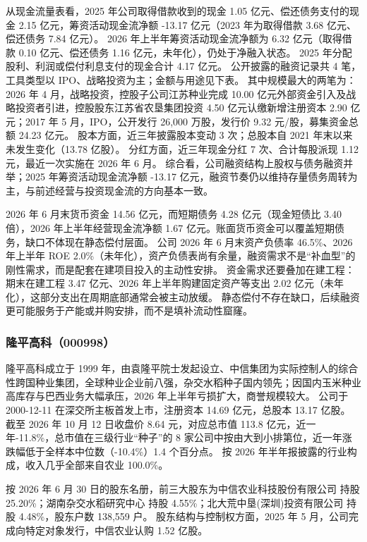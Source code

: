  从现金流量表看，2025 年公司取得借款收到的现金 1.05 亿元、偿还债务支付的现金 2.15 亿元，筹资活动现金流净额 -13.17 亿元（2023 年为取得借款 3.68 亿元、偿还债务 7.84 亿元）。 2026 年上半年筹资活动现金流净额为 6.32 亿元（取得借款 0.10 亿元、偿还债务 1.16 亿元，未年化），仍处于净融入状态。 2025 年分配股利、利润或偿付利息支付的现金合计 4.17 亿元。 公开披露的融资记录共 4 笔，工具类型以 IPO、战略投资为主；金额与用途见下表。 其中规模最大的两笔为：2026 年 4 月，战略投资，控股子公司江苏种业完成 10.00 亿元外部资金引入及战略投资者引进，控股股东江苏省农垦集团投资 4.50 亿元认缴新增注册资本 2.90 亿元；2017 年 5 月，IPO，公开发行 26,000 万股，发行价 9.32 元/股，募集资金总额 24.23 亿元。 股本方面，近三年披露股本变动 3 次；总股本自 2021 年末以来未发生变化（13.78 亿股）。 分红方面，近三年现金分红 7 次、合计每股派现 1.12 元，最近一次实施在 2026 年 6 月。 综合看，公司融资结构上股权与债务融资并举；2025 年筹资活动现金流净额 -13.17 亿元，融资节奏仍以维持存量债务周转为主，与前述经营与投资现金流的方向基本一致。

 2026 年 6 月末货币资金 14.56 亿元，而短期债务 4.28 亿元（现金短债比 3.40 倍），2026 年上半年经营现金流净额 1.67 亿元。账面货币资金可以覆盖短期债务，缺口不体现在静态偿付层面。 公司 2026 年 6 月末资产负债率 46.5\%、2026 年上半年 ROE 2.0\%（未年化），资产负债表尚有余量，融资需求不是“补血型”的刚性需求，而是配套在建项目投入的主动性安排。 资金需求还要叠加在建工程：期末在建工程 3.47 亿元、2026 年上半年购建固定资产等支出 2.02 亿元（未年化），这部分支出在周期底部通常会被主动放缓。 静态偿付不存在缺口，后续融资更可能服务于产能或并购安排，而不是填补流动性窟窿。




\subsubsection{隆平高科（000998）}
\label{co:000998}

 隆平高科成立于 1999 年，由袁隆平院士发起设立、中信集团为实际控制人的综合性跨国种业集团，全球种业企业前八强，杂交水稻种子国内领先；因国内玉米种业高库存与巴西业务大幅承压，2026 年上半年亏损扩大，商誉规模较大。 公司于 2000-12-11 在深交所主板首发上市，注册资本 14.69 亿元，总股本 13.17 亿股。 截至 2026 年 10 月 12 日收盘价 8.64 元，对应总市值 113.8 亿元，近一年-11.8\%，总市值在三级行业“种子”的 8 家公司中按由大到小排第位，近一年涨跌幅低于全样本中位数（-10.4\%）1.4 个百分点。 按 2026 年半年报披露的行业构成，收入几乎全部来自农业 100.0\%。

 按 2026 年 6 月 30 日的股东名册，前三大股东为中信农业科技股份有限公司 持股 25.20\%；湖南杂交水稻研究中心 持股 4.55\%；北大荒中垦(深圳)投资有限公司 持股 4.48\%，股东户数 138,559 户。 股东结构与控制权方面，2025 年 5 月，公司完成向特定对象发行，中信农业认购 1.52 亿股。

